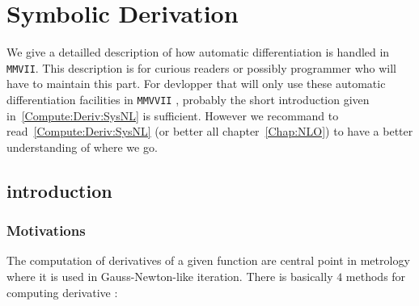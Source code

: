 \chapter{Symbolic Derivation}

We give a detailled description of how automatic differentiation is handled in {\tt MMVII}.
This description is for curious readers or possibly programmer who will have to maintain this part.
For devlopper that will only use these  automatic differentiation facilities in {\tt MMVVII} , probably the 
short introduction given in~\ref{Compute:Deriv:SysNL} is sufficient.
However we recommand to read~\ref{Compute:Deriv:SysNL} (or better all chapter~\ref{Chap:NLO}) to
have a better understanding of where we go.



\section{introduction}


\subsection{Motivations}

The computation of derivatives of a given function are central point in metrology
where it is used in Gauss-Newton-like iteration.  There is basically $4$ methods
for computing derivative :

